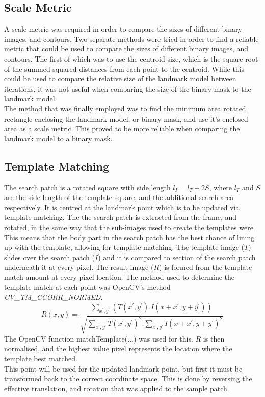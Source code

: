 \documentclass[a4paper, 12pt]{article}
\begin{document}
	\subsection{Scale Metric}
	A scale metric was required in order to compare the sizes of different binary images, and contours.
	Two separate methods were tried in order to find a reliable metric that could be used to compare the sizes of different binary images, and contours.
	The first of which was to use the centroid size, which is the square root of the summed squared distances from each point to the centroid.
	While this could be used to compare the relative size of the landmark model between iterations, it was not useful when comparing the size of the binary
	mask to the landmark model.\\
	The method that was finally employed was to find the minimum area rotated rectangle enclosing the landmark model, or binary mask, and use it's enclosed 	area as a scale metric. This proved to be more reliable when comparing the landmark model to a binary mask.
	\subsection{Template Matching}
	The search patch is a rotated square with side length $l_I=l_T + 2S$, where  $l_T$ and $S$ are the side length of the template square, and the additional search area respectively.
	It is centred at the landmark point which is to be updated via template matching.
	The the search patch is extracted from the frame, and rotated, in the same way that the sub-images used to create the templates were.
	This means that the body part in the search patch has the best
	chance of lining up with the template, allowing for template matching.
	The template image ($T$) slides over the search patch ($I$) and it is compared to section of the search patch underneath it at every pixel. The result image ($R$) is formed from the template match amount at every pixel location.
	The method used to determine the template match at each point was OpenCV's method \emph{CV\_TM\_CCORR\_NORMED}.
	$$R(x,y) = \frac{\sum_{x^{'},y^{'}}(T(x^{'},y^{'}) . I(x+x^{'},y+y^{'}))}{\sqrt{\sum_{x^{'},y^{'}}T(x^{'},y^{'})^2 . \sum_{x^{'},y^{'}} I(x+x^{'},y+y^{'})^2}}$$
		The OpenCV function matchTemplate(...) was used for this.
	$R$ is then normalised, and the highest value pixel represents the location where the template best matched.\\
	This point will be used for the updated landmark point, but first it must be transformed back to the correct coordinate space.
	This is done by reversing the effective translation, and rotation that was applied to the sample patch.
	
\end{document}
